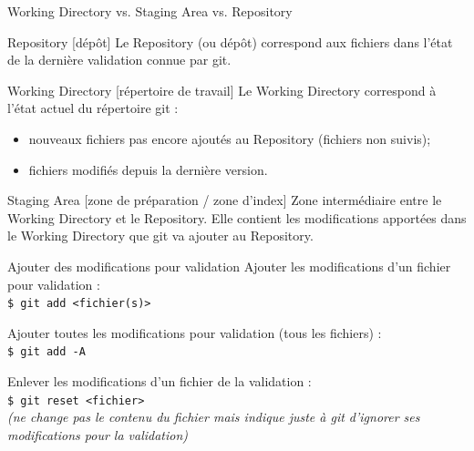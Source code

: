 \documentclass[usepdftitle=false]{beamer}
\begin{document}
\begin{frame}{Working Directory vs. Staging Area vs. Repository}
	\begin{block}{Repository [dépôt]}
		Le Repository (ou dépôt) correspond aux fichiers dans l'état de la dernière validation connue par git.
	\end{block}

	\begin{block}{Working Directory [répertoire de travail]}
		Le Working Directory correspond à l'état actuel du répertoire git :
		\begin{itemize}
			\item nouveaux fichiers pas encore ajoutés au Repository (fichiers non suivis);
			\item fichiers modifiés depuis la dernière version.
		\end{itemize}
	\end{block}

	\begin{block}{Staging Area [zone de préparation / zone d'index]}
		Zone intermédiaire entre le Working Directory et le Repository.
		Elle contient les modifications apportées dans le Working Directory que git va ajouter au Repository.
	\end{block}

\end{frame}

\begin{frame}[fragile]{Ajouter des modifications pour validation}
	Ajouter les modifications d'un fichier pour validation : \\
	\verb+$ git add <fichier(s)>+

	\medskip

	Ajouter toutes les modifications pour validation (tous les fichiers) : \\
	\verb+$ git add -A+

	\medskip

	Enlever les modifications d'un fichier de la validation : \\
	\verb+$ git reset <fichier>+ \\
	{\it (ne change pas le contenu du fichier mais indique juste à git d'ignorer ses modifications pour la validation)}

\end{frame}
\end{document}
